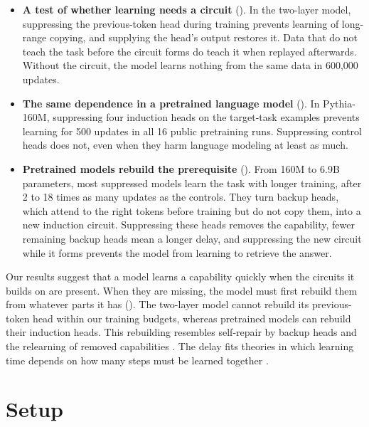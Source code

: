 \begin{itemize}[leftmargin=1.2em,itemsep=1pt,topsep=2pt]
\item \textbf{A test of whether learning needs a circuit} ().
In the two-layer model, suppressing the previous-token head during training prevents
learning of long-range copying, and supplying the head's output restores it. Data
that do not teach the task before the circuit forms do teach it when replayed
afterwards. Without the circuit, the model learns nothing from the same data in
600,000 updates.
\item \textbf{The same dependence in a pretrained language model}
(). In Pythia-160M, suppressing four induction heads on the
target-task examples prevents learning for 500 updates in all 16 public pretraining
runs. Suppressing control heads does not, even when they harm language modeling at
least as much.
\item \textbf{Pretrained models rebuild the prerequisite} ().
From 160M to 6.9B parameters, most suppressed models learn the task with longer
training, after 2 to 18 times as many updates as the controls. They turn backup
heads, which attend to the right tokens before training but do not copy them, into
a new induction circuit. Suppressing these heads removes the capability, fewer
remaining backup heads mean a longer delay, and suppressing the new circuit while it
forms prevents the model from learning to retrieve the answer.
\end{itemize}

Our results suggest that a model learns a capability quickly when the circuits it
builds on are present. When they are missing, the model must first rebuild them from
whatever parts it has (). The two-layer model cannot rebuild
its previous-token head within our training budgets, whereas pretrained models can
rebuild their induction heads. This rebuilding resembles self-repair by backup heads
\citep{wang2023ioi,mcgrath2023hydra,rushing2024selfrepair} and the relearning of
removed capabilities \citep{lo2024relearn,jain2024mechanistically}. The delay fits
theories in which learning time depends on how many steps must be learned together
\citep{abbe2021staircase,abbe2023leap}.

\section{Setup}
\label{sec:setup}

